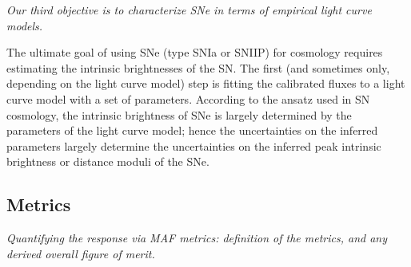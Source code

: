 {\emph{Our third objective is to characterize SNe in terms of empirical
    light curve models.}}

The ultimate goal of using SNe (type SNIa or SNIIP) for cosmology requires estimating the
intrinsic brightnesses of the SN. The first (and sometimes only, depending on the light
curve model) step is fitting the calibrated fluxes to a light curve model with a set of
parameters. According to the ansatz used in SN cosmology, the intrinsic brightness of SNe
is largely determined by the parameters of the light curve model; hence the uncertainties
on the inferred parameters largely determine the uncertainties on the inferred peak
intrinsic brightness or distance moduli of the SNe.








\subsection{Metrics}
\label{sec:\secname:metrics}

{\it Quantifying the response via MAF metrics: definition of the metrics,
and any derived overall figure of merit.}

